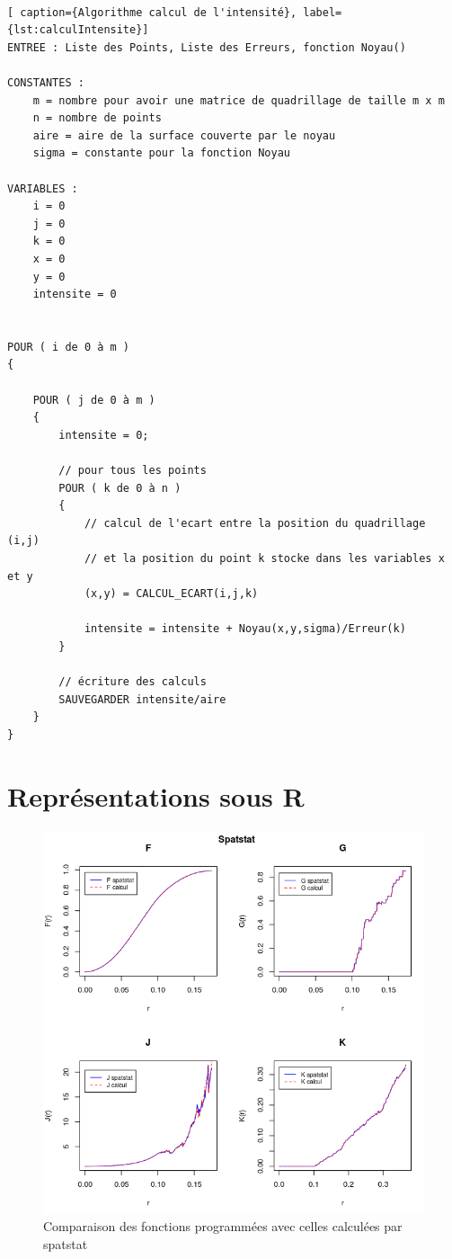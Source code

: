 \documentclass[stage2a]{tnreport}
\begin{document}
\cleardoublepage
~
\vspace{3cm}
\begin{lstlisting}[ caption={Algorithme calcul de l'intensité}, label={lst:calculIntensite}]
ENTREE : Liste des Points, Liste des Erreurs, fonction Noyau()

CONSTANTES :
    m = nombre pour avoir une matrice de quadrillage de taille m x m
    n = nombre de points
    aire = aire de la surface couverte par le noyau
    sigma = constante pour la fonction Noyau

VARIABLES :
    i = 0
    j = 0
    k = 0
    x = 0
    y = 0
    intensite = 0


POUR ( i de 0 à m )
{

	POUR ( j de 0 à m )
	{
        intensite = 0;
        
        // pour tous les points
        POUR ( k de 0 à n )
        {
            // calcul de l'ecart entre la position du quadrillage (i,j)
            // et la position du point k stocke dans les variables x et y
            (x,y) = CALCUL_ECART(i,j,k)
            
            intensite = intensite + Noyau(x,y,sigma)/Erreur(k)
        }
        
        // écriture des calculs
        SAUVEGARDER intensite/aire
	}
}
\end{lstlisting}

\cleardoublepage

\chapter{Représentations sous R}

\begin{center}
\begin{figure}[h]
  \centering
  \includegraphics[scale=0.7]{figures/calcul&spatstat.png}
  \caption{Comparaison des fonctions programmées avec celles calculées par spatstat }
  \label{fig:compSpatstat}
\end{figure}
\end{center}
\end{document}
